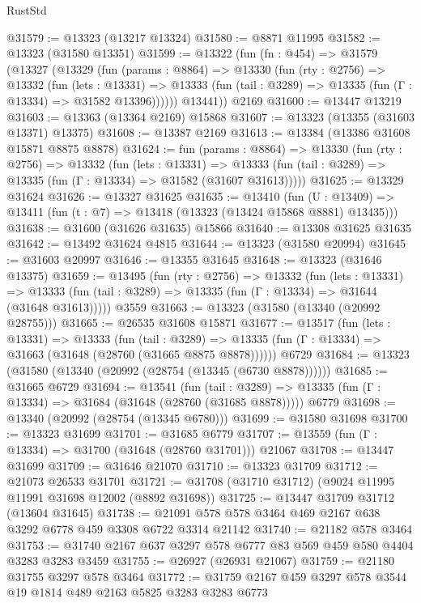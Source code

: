 \begin{lexlean}{RustStd}
\begin{coremodule}
@31579 := @13323 (@13217 @13324)
@31580 := @8871 @11995
@31582 := @13323 (@31580 @13351)
@31599 := @13322
    (fun (fn : @454) =>
    @31579
      (@13327
        (@13329
          (fun (params : @8864) =>
          @13330
            (fun (rty : @2756) =>
            @13332
              (fun (lets : @13331) =>
              @13333 (fun (tail : @3289) => @13335 (fun (Γ : @13334) => @31582 @13396))))))
        @13441))
    @2169
@31600 := @13447 @13219
@31603 := @13363 (@13364 @2169) @15868
@31607 := @13323 (@13355 (@31603 @13371) @13375)
@31608 := @13387 @2169
@31613 := @13384 (@13386 @31608 @15871 @8875 @8878)
@31624 := fun (params : @8864) =>
  @13330
    (fun (rty : @2756) =>
    @13332
      (fun (lets : @13331) =>
      @13333 (fun (tail : @3289) => @13335 (fun (Γ : @13334) => @31582 (@31607 @31613)))))
@31625 := @13329 @31624
@31626 := @13327 @31625
@31635 := @13410
    (fun (U : @13409) => @13411 (fun (t : @7) => @13418 (@13323 (@13424 @15868 @8881) @13435)))
@31638 := @31600 (@31626 @31635) @15866
@31640 := @13308 @31625 @31635
@31642 := @13492 @31624 @4815
@31644 := @13323 (@31580 @20994)
@31645 := @31603 @20997
@31646 := @13355 @31645
@31648 := @13323 (@31646 @13375)
@31659 := @13495
    (fun (rty : @2756) =>
    @13332
      (fun (lets : @13331) =>
      @13333 (fun (tail : @3289) => @13335 (fun (Γ : @13334) => @31644 (@31648 @31613)))))
    @3559
@31663 := @13323 (@31580 (@13340 (@20992 @28755)))
@31665 := @26535 @31608 @15871
@31677 := @13517
    (fun (lets : @13331) =>
    @13333
      (fun (tail : @3289) =>
      @13335 (fun (Γ : @13334) => @31663 (@31648 (@28760 (@31665 @8875 @8878))))))
    @6729
@31684 := @13323 (@31580 (@13340 (@20992 (@28754 (@13345 (@6730 @8878))))))
@31685 := @31665 @6729
@31694 := @13541
    (fun (tail : @3289) => @13335 (fun (Γ : @13334) => @31684 (@31648 (@28760 (@31685 @8878)))))
    @6779
@31698 := @13340 (@20992 (@28754 (@13345 @6780)))
@31699 := @31580 @31698
@31700 := @13323 @31699
@31701 := @31685 @6779
@31707 := @13559 (fun (Γ : @13334) => @31700 (@31648 (@28760 @31701))) @21067
@31708 := @13447 @31699
@31709 := @31646 @21070
@31710 := @13323 @31709
@31712 := @21073 @26533 @31701
@31721 := @31708 (@31710 @31712) (@9024 @11995 @11991 @31698 @12002 (@8892 @31698))
@31725 := @13447 @31709 @31712 (@13604 @31645)
@31738 := @21091 @578 @578 @3464 @469 @2167 @638 @3292 @6778 @459 @3308 @6722 @3314 @21142
@31740 := @21182 @578 @3464
@31753 := @31740 @2167 @637 @3297 @578 @6777 @83 @569 @459 @580 @4404 @3283 @3283 @3459
@31755 := @26927 (@26931 @21067)
@31759 := @21180 @31755 @3297 @578 @3464
@31772 := @31759 @2167 @459 @3297 @578 @3544 @19 @1814 @489 @2163 @5825 @3283 @3283 @6773

\end{coremodule}
\end{lexlean}
